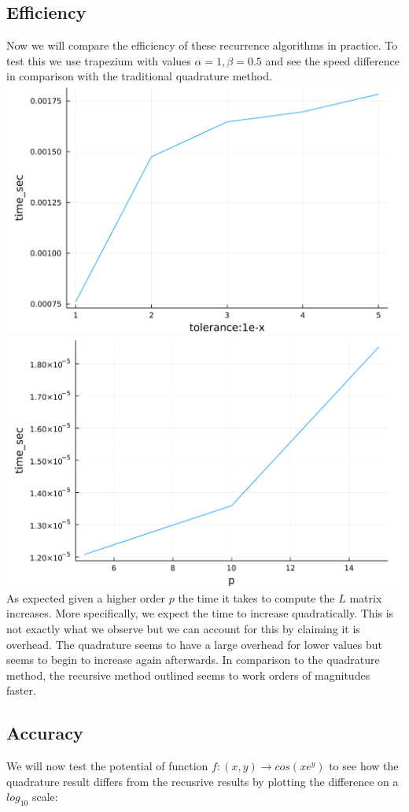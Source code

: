 \documentclass{article}
\begin{document}
\subsection{Efficiency}
Now we will compare the efficiency of these recurrence algorithms in practice.
To test this we use trapezium with values $\alpha=1,\beta=0.5$ and see the speed difference in comparison with the traditional quadrature method.
\includegraphics[width=.5\textwidth]{quadtime}
\includegraphics[width=.5\textwidth]{logtime}
As expected given a higher order $p$ the time it takes to compute the $L$ matrix increases.
More specifically, we expect the time to increase quadratically.
This is not exactly what we observe but we can account for this by claiming it is overhead.
The quadrature seems to have a large overhead for lower values but seems to begin to increase again afterwards.
In comparison to the quadrature method, the recursive method outlined seems to work orders of magnitudes faster.
\subsection{Accuracy}
We will now test the potential of function $f:(x,y)\rightarrow cos(xe^y)$ to see how the quadrature result differs from the recusrive results by plotting the difference on a $log_{10}$ scale:
\end{document}
